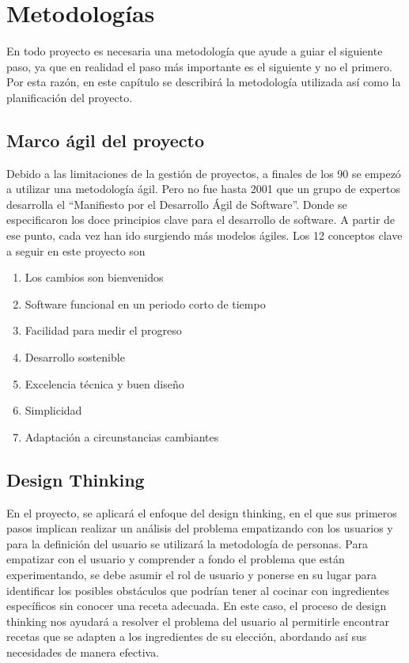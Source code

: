 \chapter{Metodologías}
En todo proyecto es necesaria una metodología que ayude a guiar el siguiente paso, ya que en realidad el paso más importante es el siguiente y no el primero. Por esta razón, en este capítulo se describirá la metodología utilizada así como la planificación del proyecto.

\section{Marco ágil del proyecto}
Debido a las limitaciones de la gestión de proyectos, a finales de los 90 se empezó a utilizar una metodología ágil. Pero no fue hasta 2001 que un grupo de expertos desarrolla el ``Manifiesto por el Desarrollo Ágil de Software''. Donde se especificaron los doce principios clave para el desarrollo de software. A partir de ese punto, cada vez han ido surgiendo más modelos ágiles. Los 12 conceptos clave\cite{OBS2016} a seguir en este proyecto son\:
\begin{enumerate}
    \item Los cambios son bienvenidos
    \item Software funcional en un periodo corto de tiempo
    \item Facilidad para medir el progreso
    \item Desarrollo sostenible
    \item Excelencia técnica y buen diseño
    \item Simplicidad
    \item Adaptación a circunstancias cambiantes
\end{enumerate}

\section{Design Thinking}
En el proyecto, se aplicará el enfoque del \gls{design thinking}, en el que sus primeros pasos implican realizar un análisis del problema empatizando con los usuarios y para la definición del usuario se utilizará la metodología de personas. Para empatizar con el usuario y comprender a fondo el problema que están experimentando, se debe asumir el rol de usuario y ponerse en su lugar para identificar los posibles obstáculos que podrían tener al cocinar con ingredientes específicos sin conocer una receta adecuada. En este caso, el proceso de \gls{design thinking} nos ayudará a resolver el problema del usuario al permitirle encontrar recetas que se adapten a los ingredientes de su elección, abordando así sus necesidades de manera efectiva.

